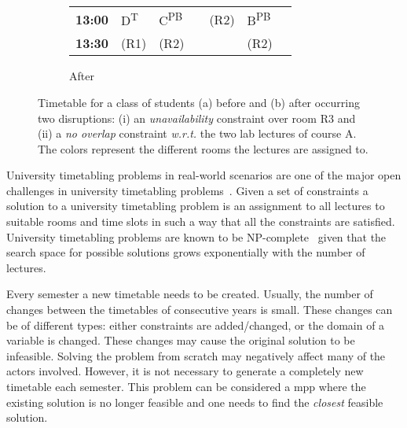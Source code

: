 \documentclass[twocolumn,natbib]{svjour3}          %
\newcounter{constraint}
\begin{document}
\begin{figure*}[t]
\begin{subfigure}{.5\textwidth}
{\begin{tabular}{|c||P{1.4cm}|P{1.4cm}|P{1.4cm}|P{1.4cm}|P{1.4cm}|p{0.4cm}}
				\textbf{13:00}   &   D\textsuperscript{T}       &   C\textsuperscript{PB}   &                                                       &    (R2)                   &    B\textsuperscript{PB}      &    \\ 
				\textbf{13:30}   &   (R1)                       &   (R2)                    &                                                       &                                                   &    (R2)                       &   \\ 
		\end{tabular}}
		\caption{After}
		\label{fig:after}
	\end{subfigure}
	\caption{Timetable for a class of students (a) before and (b) after occurring two disruptions: (i) an  \textit{unavailability} constraint over room R3 and (ii) a \textit{no overlap} constraint \textit{w.r.t.} the two lab lectures of course A. The colors represent the different rooms the lectures are assigned to.}
	\label{fig:original}
\end{figure*}


University timetabling problems in real-world scenarios are one of the major open challenges in university timetabling problems~\citep{mccollum2006university,DBLP:journals/anor/VrielinkJHH19}. Given a set of constraints a solution to a university timetabling problem is an assignment to all lectures to suitable rooms and time slots in such a way that all the constraints  are satisfied. University timetabling problems are known to be NP-complete~\citep{DBLP:journals/siamcomp/EvenIS76} given that the search space for possible solutions grows exponentially with the number of lectures. 

Every semester a new timetable needs to be created. Usually, the number of changes between the timetables of consecutive years is small. These changes can be of different types: either constraints are added/changed, or the domain of a variable is changed. These changes may cause the original solution to be infeasible. Solving the problem from scratch may negatively affect many of the actors involved. However, it is not necessary to generate a completely new timetable each semester. This problem can be considered a \acrlong{mpp} where the existing solution is no longer feasible and one needs to find the \textit{closest} feasible solution. 
\end{document}

